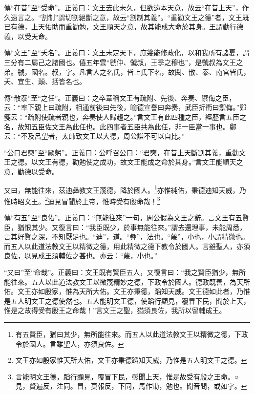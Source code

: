 {\noindent\zhuan{}\fzbyks 傳“在昔”至“受命”。正義曰：文王去此未久，但欲遠本天意，故云“在昔上天”，作久遠言之。“割制”謂切割絕斷之意，故云“割制其義”。“重勸文王之德”者，文王既已有德，上天佑助而重勸勉，文王順天之意，故其能成大命於其身。王謂勤行德義，以受天命。 \par}

{\noindent\zhuan{}\fzbyks 傳“文王”至“夭名”。正義曰：文王未定天下，庶幾能修政化，以和我所有諸夏，謂三分有二屬己之諸國也。僖五年雲“虢仲、虢叔，王季之穆也”，是虢叔為文王之弟。虢，國名。叔，字。凡言人之名氏，皆上氏下名，故閎、散、泰、南宮皆氏，夭、宜生、顛、括皆名也。 \par}

{\noindent\zhuan{}\fzbyks 傳“散泰”至“之任”。正義曰：之卒章稱文王有疏附、先後、奔奏、禦侮之臣，云：“率下親上曰疏附，相通前後曰先後，喻德宣譽曰奔奏，武臣折衝曰禦侮。”鄭箋云：“疏附使疏者親也，奔奏使人歸趨之。”言文王有此四種之臣，經歷言五臣之名，故知五臣佐文王為此任也。此四事者五臣共為此任，非一臣當一事也。鄭云：“不及呂望者，太師致文王以大德，周公謙不可以自比。” \par}

{\noindent\shu{}\fzkt “公曰君奭”至“厥躬”。正義曰：公呼召公曰：“君奭，在昔上天斷割其義，重勸文王之德。以文王有德，勸勉使之成功，故文王能成之命於其身。”言文王能順天之意，勤德以受命。 \par}

又曰，無能往來，茲迪彝教文王蔑德，降於國人。\footnote{有五賢臣，猶曰其少，無所能往來。而五人以此道法教文王以精微之德，下政令於國人。言雖聖人，亦須良佐。}亦惟純佑，秉德迪知天威，乃惟時昭文王。\footnote{文王亦如殷家惟天所大佑，文王亦秉德蹈知天威，乃惟是五人明文王之德。}迪見冒聞於上帝，惟時受有殷命哉！\footnote{言能明文王德，蹈行顯見，覆冒下民，彰聞上天，惟是故受有殷之王命。○見，賢遍反，注同。冒，莫報反，下同，馬作勖，勉也。聞音問，或如字。}


{\noindent\zhuan{}\fzbyks 傳“有五”至“良佑”。正義曰：“無能往來”一句，周公假為文王之辭。言文王有五賢臣，猶恨其少。又復言曰：“我臣既少，於事無能往來。”謂去還理事，未能周悉，言其好賢之深，不知厭足也。“迪”，道。“彝”，法也。“蔑”，小也，小謂精微也。而五人以此道法教文王以精微之德，用此精微之德下教令於國人。言雖聖人，亦須良佐，以見成王須輔佐之甚也。亦云：“蔑，小也。” \par}

{\noindent\shu{}\fzkt “又曰”至“命哉”。正義曰：文王既有賢臣五人，又復言曰：“我之賢臣猶少，無所能往來。五人以此道法教文王以微蔑精妙之德，下政令於國人。德政既善，為天所佑。文王亦如殷家，惟為天所大佑。文王亦秉德，蹈知天威。文王德如此者，乃惟是五人明文王之德使然也。五人能明文王德，使蹈行顯見，覆冒下民，聞於上天，惟是之故得受有殷王之命哉！”言文王之聖，猶須良佐，我所以留輔成王。 \par}

